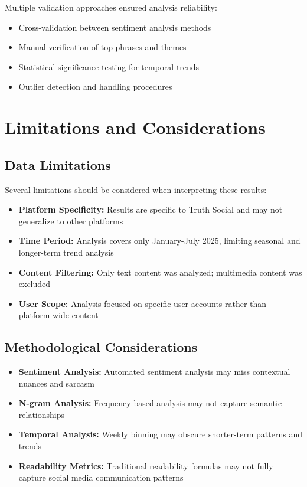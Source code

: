 \documentclass[12pt,a4paper]{article}
\begin{document}
Multiple validation approaches ensured analysis reliability:
\begin{itemize}
    \item Cross-validation between sentiment analysis methods
    \item Manual verification of top phrases and themes
    \item Statistical significance testing for temporal trends
    \item Outlier detection and handling procedures
\end{itemize}

\section{Limitations and Considerations}

\subsection{Data Limitations}

Several limitations should be considered when interpreting these results:

\begin{itemize}
    \item \textbf{Platform Specificity:} Results are specific to Truth Social and may not generalize to other platforms
    \item \textbf{Time Period:} Analysis covers only January-July 2025, limiting seasonal and longer-term trend analysis
    \item \textbf{Content Filtering:} Only text content was analyzed; multimedia content was excluded
    \item \textbf{User Scope:} Analysis focused on specific user accounts rather than platform-wide content
\end{itemize}

\subsection{Methodological Considerations}

\begin{itemize}
    \item \textbf{Sentiment Analysis:} Automated sentiment analysis may miss contextual nuances and sarcasm
    \item \textbf{N-gram Analysis:} Frequency-based analysis may not capture semantic relationships
    \item \textbf{Temporal Analysis:} Weekly binning may obscure shorter-term patterns and trends
    \item \textbf{Readability Metrics:} Traditional readability formulas may not fully capture social media communication patterns
\end{itemize}
\end{document}
